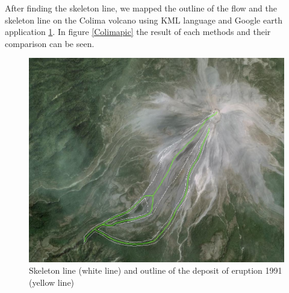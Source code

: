 \documentclass[letterpaper,10pt]{article}
\begin{document}

After finding the skeleton line, we mapped the outline of the flow and the skeleton line on the Colima volcano 
using KML language and Google earth application \ref{skel_outline}. In figure \ref{Colimapic} the result of each methods and their comparison can be seen. 

\begin{figure}[H]
\centerline{\includegraphics[width=.35\textwidth]{IMAGES/skeleton_outline1.jpg}}
\caption{Skeleton line (white line) and outline of the deposit of eruption 1991 (yellow line)}
\label{skel_outline}
\end{figure}
\end{document}
